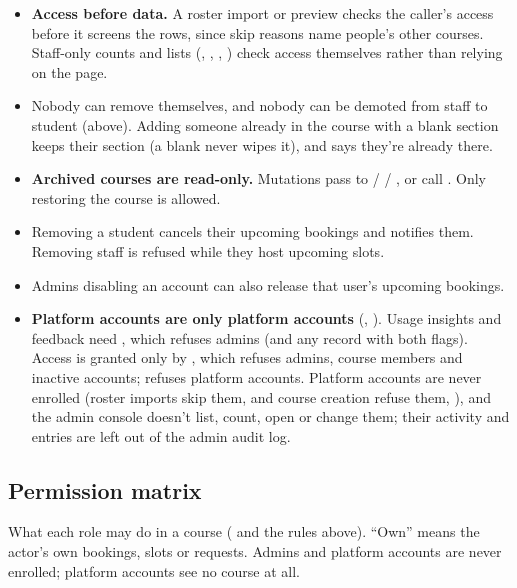 \begin{itemize}
  \item \textbf{Access before data.} A roster import or preview checks the caller's access before it screens the rows, since skip reasons name people's other courses. Staff-only counts and lists (, , , ) check access themselves rather than relying on the page.
  \item Nobody can remove themselves, and nobody can be demoted from staff to student (above). Adding someone already in the course with a blank section keeps their section (a blank never wipes it), and says they're already there.
  \item \textbf{Archived courses are read-only.} Mutations pass  to  /  / , or call . Only restoring the course is allowed.
  \item Removing a student cancels their upcoming bookings and notifies them. Removing staff is refused while they host upcoming slots.
  \item Admins disabling an account can also release that user's upcoming bookings.
  \item \textbf{Platform accounts are only platform accounts} (, ). Usage insights and feedback need , which refuses admins (and any record with both flags). Access is granted only by , which refuses admins, course members and inactive accounts;  refuses platform accounts. Platform accounts are never enrolled (roster imports skip them,  and course creation refuse them, ), and the admin console doesn't list, count, open or change them; their activity and  entries are left out of the admin audit log.
\end{itemize}

\subsection*{Permission matrix}

What each role may do in a course ( and the rules above). ``Own'' means
the actor's own bookings, slots or requests. Admins and platform accounts are never enrolled;
platform accounts see no course at all.

